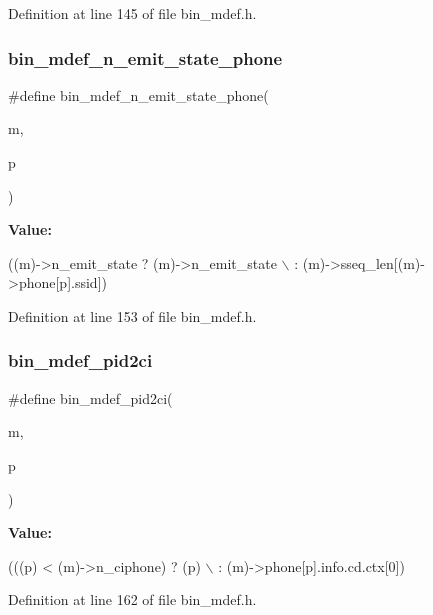 Definition at line 145 of file bin\+\_\+mdef.\+h.

\mbox{\label{bin__mdef_8h_a4ee9d5f0c8177126304d420f368fa522}} 
\subsubsection{bin\+\_\+mdef\+\_\+n\+\_\+emit\+\_\+state\+\_\+phone}
{\footnotesize\ttfamily \#define bin\+\_\+mdef\+\_\+n\+\_\+emit\+\_\+state\+\_\+phone(\begin{DoxyParamCaption}\item[{}]{m,  }\item[{}]{p }\end{DoxyParamCaption})}

{\bfseries Value\+:}
\begin{DoxyCode}
((m)->n\_emit\_state ? (m)->n\_emit\_state \(\backslash\)
                                          : (m)->sseq\_len[(m)->phone[p].ssid])
\end{DoxyCode}


Definition at line 153 of file bin\+\_\+mdef.\+h.

\mbox{\label{bin__mdef_8h_ae7897f787dca12d85aeb6fe6ed8ade8d}} 
\subsubsection{bin\+\_\+mdef\+\_\+pid2ci}
{\footnotesize\ttfamily \#define bin\+\_\+mdef\+\_\+pid2ci(\begin{DoxyParamCaption}\item[{}]{m,  }\item[{}]{p }\end{DoxyParamCaption})}

{\bfseries Value\+:}
\begin{DoxyCode}
(((p) < (m)->n\_ciphone) ? (p) \(\backslash\)
                                         : (m)->phone[p].info.cd.ctx[0])
\end{DoxyCode}


Definition at line 162 of file bin\+\_\+mdef.\+h.



